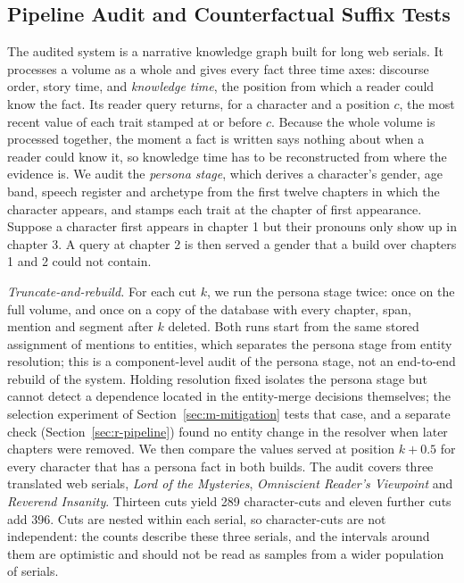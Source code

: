 \documentclass[sn-mathphys]{sn-jnl}%
\theoremstyle{thmstyleone}%
\theoremstyle{thmstyletwo}%
\theoremstyle{thmstylethree}%
\begin{document}
\subsection{Pipeline Audit and Counterfactual Suffix Tests}\label{sec:m-pipeline}

The audited system is a narrative knowledge graph built for long web serials. It processes a volume as a whole and gives every fact three time axes: discourse order, story time, and \emph{knowledge time}, the position from which a reader could know the fact. Its reader query returns, for a character and a position $c$, the most recent value of each trait stamped at or before $c$. Because the whole volume is processed together, the moment a fact is written says nothing about when a reader could know it, so knowledge time has to be reconstructed from where the evidence is. We audit the \emph{persona stage}, which derives a character's gender, age band, speech register and archetype from the first twelve chapters in which the character appears, and stamps each trait at the chapter of first appearance. Suppose a character first appears in chapter 1 but their pronouns only show up in chapter 3. A query at chapter 2 is then served a gender that a build over chapters 1 and 2 could not contain.

\emph{Truncate-and-rebuild.} For each cut $k$, we run the persona stage twice: once on the full volume, and once on a copy of the database with every chapter, span, mention and segment after $k$ deleted. Both runs start from the same stored assignment of mentions to entities, which separates the persona stage from entity resolution; this is a component-level audit of the persona stage, not an end-to-end rebuild of the system. Holding resolution fixed isolates the persona stage but cannot detect a dependence located in the entity-merge decisions themselves; the selection experiment of Section~\ref{sec:m-mitigation} tests that case, and a separate check (Section~\ref{sec:r-pipeline}) found no entity change in the resolver when later chapters were removed. We then compare the values served at position $k+0.5$ for every character that has a persona fact in both builds. The audit covers three translated web serials, \emph{Lord of the Mysteries}, \emph{Omniscient Reader's Viewpoint} and \emph{Reverend Insanity}. Thirteen cuts yield 289 character-cuts and eleven further cuts add 396. Cuts are nested within each serial, so character-cuts are not independent: the counts describe these three serials, and the intervals around them are optimistic and should not be read as samples from a wider population of serials.
\end{document}
